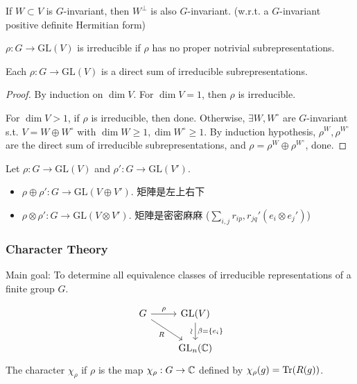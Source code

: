 \begin{remark}
  If $W \subset V$ is $G$-invariant, then $W^\perp$ is also $G$-invariant.
  (w.r.t. a $G$-invariant positive definite Hermitian form)
\end{remark}

\begin{definition}
  $\rho: G \to \text{GL}(V)$ is irreducible if $\rho$ has no proper notrivial
  subrepresentations.
\end{definition}

\begin{theorem}
  Each $\rho: G\to \text{GL}(V)$ is a direct sum of irreducible
  subrepresentations.
  \begin{proof}
    By induction on $\dim V$. For $\dim V = 1$, then $\rho$ is irreducible.

    For $\dim V > 1$, if $\rho$ is irreducible, then done.
    Otherwise, $\exists W, W^\circ$ are $G$-invariant s.t.
    $V = W \oplus W^\circ$ with $\dim W \ge 1, \dim W^\circ \ge 1$.
    By induction hypothesis, $\rho^W, \rho^{W^\circ}$ are the direct sum
    of irreducible subrepresentations, and $\rho = \rho^W \oplus \rho^{W^\circ}$, done.
  \end{proof}
\end{theorem}

\begin{remark}
  Let $\rho: G \to \text{GL}(V)$ and $\rho': G \to \text{GL}(V')$.
  \begin{itemize}
    \item $\rho \oplus \rho': G \to \text{GL}(V\oplus V')$.
      矩陣是左上右下
    \item $\rho \otimes \rho': G \to \text{GL}(V\otimes V')$.
      矩陣是密密麻麻 ($\sum_{i,j} r_{ip}, r_{jq}' (e_i \otimes e_j')$)
  \end{itemize}
\end{remark}

\subsubsection{Character Theory }

Main goal: To determine all equivalence classes of irreducible representations
of a finite group $G$.

\begin{definition}
  \[
    \begin{tikzcd}
      G \arrow{r}{\rho} \arrow[swap]{dr}{R}
      & \text{GL}(V) \arrow[d, "\beta=\{e_i\}", "\rotatebox{90}{\(\sim\)}"'] \\
      & \text{GL}_n(\Cb)
    \end{tikzcd}
  \]
  The character $\chi_\rho$ if $\rho$ is the map
  $\chi_\rho: G\to \mathbb{C}$ defined by $\chi_\rho(g) = \operatorname{Tr}(R(g))$.
\end{definition}

